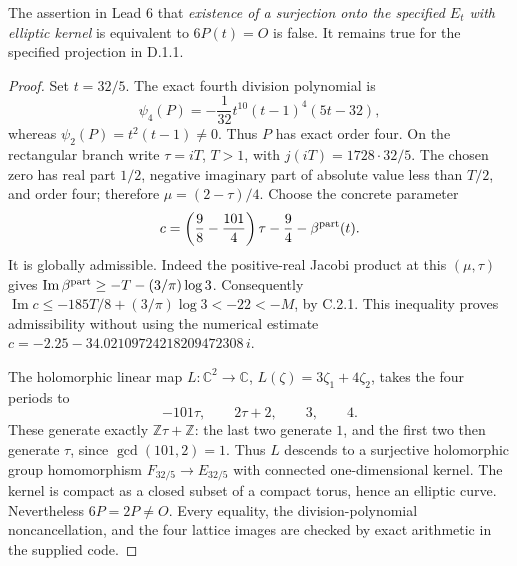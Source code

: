 \begin{theorem}[D.1.3; Refuted]\label{st:D.1.3}
The assertion in Lead 6 that \emph{existence of a surjection onto the
specified \(E_t\) with elliptic kernel} is equivalent to \(6P(t)=O\)
is false. It remains true for the specified projection in D.1.1.
\end{theorem}
\begin{proof}
Set \(t=32/5\). The exact fourth division polynomial is
\[
 \psi_4(P)=-\frac1{32}t^{10}(t-1)^4(5t-32),
\]
whereas \(\psi_2(P)=t^2(t-1)\ne0\). Thus \(P\) has exact order four.
On the rectangular branch write \(\tau=iT\), \(T>1\), with
\(j(iT)=1728\cdot32/5\). The chosen zero has real part \(1/2\), negative
imaginary part of absolute value less than \(T/2\), and order four;
therefore \(\mu=(2-\tau)/4\). Choose the concrete parameter
\[
 c=\left(\frac98-\frac{101}{4}\right)\tau-\frac94
       -\beta^{\rm part}(t).
\]
It is globally admissible. Indeed the positive-real Jacobi product at this
\((\mu,\tau)\) gives
\(\operatorname{Im}\beta^{\rm part}\geq-T-(3/\pi)\log3\).
Consequently
\(\operatorname{Im}c\leq-185T/8+(3/\pi)\log3<-22<-M\), by C.2.1.
This inequality proves admissibility without using the numerical estimate
\(c=-2.25-34.02109724218209472308\,i\).

The holomorphic linear map \(L:\mathbb C^2\to\mathbb C\),
\(L(\zeta)=3\zeta_1+4\zeta_2\), takes the four periods to
\[
 -101\tau,\qquad2\tau+2,\qquad3,\qquad4.
\]
These generate exactly \(\mathbb Z\tau+\mathbb Z\): the last two generate
\(1\), and the first two then generate \(\tau\), since
\(\gcd(101,2)=1\). Thus \(L\) descends to a surjective holomorphic group
homomorphism \(F_{32/5}\to E_{32/5}\) with connected one-dimensional
kernel. The kernel is compact as a closed subset of a compact torus,
hence an elliptic curve. Nevertheless \(6P=2P\ne O\).
Every equality, the division-polynomial noncancellation, and the four
lattice images are checked by exact arithmetic in the supplied code.
\end{proof}

